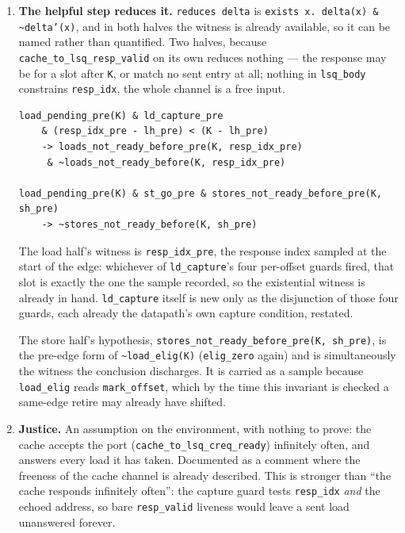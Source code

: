 \documentclass[11pt]{article}
\begin{document}
\begin{enumerate}
\item \textbf{The helpful step reduces it.} \texttt{reduces delta} is
  \texttt{exists x. delta(x) \& \textasciitilde{}delta'(x)}, and in both
  halves the witness is already available, so it can be named rather
  than quantified. Two halves, because \texttt{cache_to_lsq_resp_valid}
  on its own reduces nothing --- the response may be for a slot after
  \texttt{K}, or match no sent entry at all; nothing in \texttt{lsq_body}
  constrains \texttt{resp_idx}, the whole channel is a free input.

  {\small
  \begin{verbatim}
load_pending_pre(K) & ld_capture_pre
    & (resp_idx_pre - lh_pre) < (K - lh_pre)
    -> loads_not_ready_before_pre(K, resp_idx_pre)
     & ~loads_not_ready_before(K, resp_idx_pre)

load_pending_pre(K) & st_go_pre & stores_not_ready_before_pre(K, sh_pre)
    -> ~stores_not_ready_before(K, sh_pre)
\end{verbatim}
  }

  The load half's witness is \texttt{resp_idx_pre}, the response index
  sampled at the start of the edge: whichever of \texttt{ld_capture}'s
  four per-offset guards fired, that slot is exactly the one the
  sample recorded, so the existential witness is already in hand.
  \texttt{ld_capture} itself is new only as the disjunction of those
  four guards, each already the datapath's own capture condition,
  restated.

  The store half's hypothesis,
  \texttt{stores_not_ready_before_pre(K, sh_pre)}, is the pre-edge form
  of \texttt{\textasciitilde{}load_elig(K)} (\texttt{elig_zero} again)
  and is simultaneously the witness the conclusion discharges. It is
  carried as a sample because \texttt{load_elig} reads
  \texttt{mark_offset}, which by the time this invariant is checked a
  same-edge retire may already have shifted.

\item \textbf{Justice.} An assumption on the environment, with nothing
  to prove: the cache accepts the port (\texttt{cache_to_lsq_creq_ready})
  infinitely often, and answers every load it has taken. Documented as
  a comment where the freeness of the cache channel is already
  described. This is stronger than ``the cache responds infinitely
  often'': the capture guard tests \texttt{resp_idx} \emph{and} the
  echoed address, so bare \texttt{resp_valid} liveness would leave a
  sent load unanswered forever.
\end{enumerate}
\end{document}
